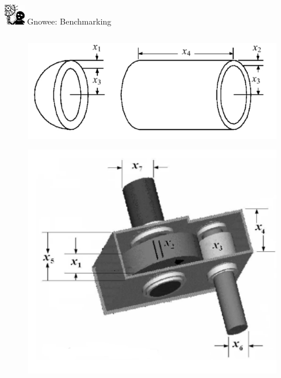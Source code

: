 \documentclass[xcolor=x11names,compress]{beamer}
\renewcommand{\(}{\begin{columns}}
\renewcommand{\)}{\end{columns}}
\newcommand{\<}[1]{\begin{column}{#1}}
\renewcommand{\>}{\end{column}}
\begin{document}
\begin{frame}{\includegraphics[width=0.35in]{../figs/Gnowee.png} Gnowee: Benchmarking \cite{Walton2013a,Yang2014,Civicioglu2013}}
  \begin{columns}
    \begin{column}{0.33\linewidth} 
      \vspace{-.5cm} 
      \begin{figure}[htp]
        \centering
        \includegraphics[width=1.0\textwidth, height=0.18\textheight]{../figs/PressureVessel.png} 
      \end{figure}        
      \vspace{-0.75cm} 
      \begin{figure}[htp]
        \centering
        \includegraphics[width=1.0\textwidth, height=0.27\textheight]{../figs/SpeedReducer.png} 

\end{figure}
\end{column}
\end{columns}
\end{frame}
\end{document}
